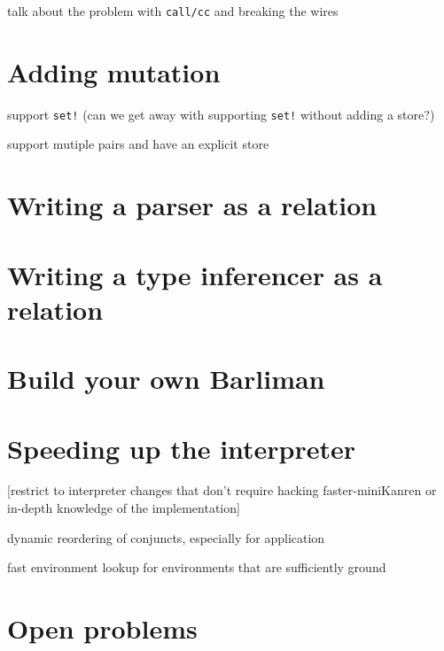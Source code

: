 \documentclass{book}
\begin{document}
talk about the problem with \verb|call/cc| and breaking the wires


\chapter{Adding mutation}%

support \verb|set!| (can we get away with supporting \verb|set!| without adding a store?)

support mutiple pairs and have an explicit store


\chapter{Writing a parser as a relation}%


\chapter{Writing a type inferencer as a relation}%


\chapter{Build your own Barliman}%


\chapter{Speeding up the interpreter}%

[restrict to interpreter changes that don't require hacking faster-miniKanren or in-depth knowledge of the implementation]

dynamic reordering of conjuncts, especially for application

fast environment lookup for environments that are sufficiently ground


\chapter{Open problems}%


\appendix
\end{document}
